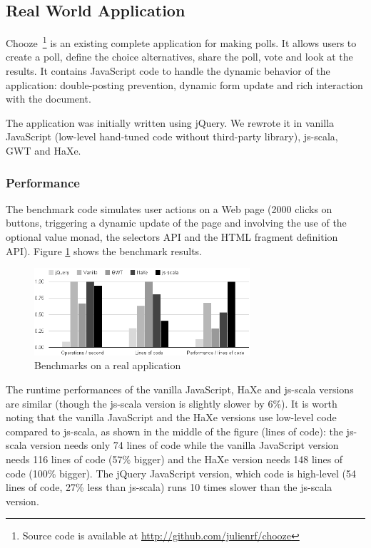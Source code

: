 \documentclass[preprint]{sigplanconf}
\begin{document}
\subsection{Real World Application}

Chooze~\footnote{Source code is available at
\href{http://github.com/julienrf/chooze}{http://github.com/julienrf/chooze}} is an existing
complete application for making polls. It allows users to create a poll, define the choice
alternatives, share the poll, vote and look at the results. It contains JavaScript code to handle
the dynamic behavior of the application: double-posting prevention, dynamic form update and rich
interaction with the document.

The application was initially written using jQuery. We rewrote it in vanilla JavaScript (low-level
hand-tuned code without third-party library), js-scala, GWT and HaXe.

\subsubsection{Performance}

The benchmark code simulates user actions on a Web page (2000 clicks on buttons, triggering a
dynamic update of the page and involving the use of the optional value monad, the selectors API and
the HTML fragment definition API). Figure \ref{benchmark} shows the benchmark results.

\begin{figure}
\centering
\includegraphics[width=8cm]{chooze.png}
\caption{Benchmarks on a real application}
\label{benchmark}
\end{figure}

The runtime performances of the vanilla JavaScript, HaXe and js-scala versions are similar (though
the js-scala version is slightly slower by 6\%). It is worth noting that the vanilla JavaScript and
the HaXe versions use low-level code compared to js-scala, as shown in the middle of the figure
(lines of code): the js-scala version needs only 74 lines of code while the vanilla JavaScript
version needs 116 lines of code (57\% bigger) and the HaXe version needs 148 lines of code (100\%
bigger). The jQuery JavaScript version, which code is high-level (54 lines of code, 27\% less
than js-scala) runs 10 times slower than the js-scala version.
\end{document}
